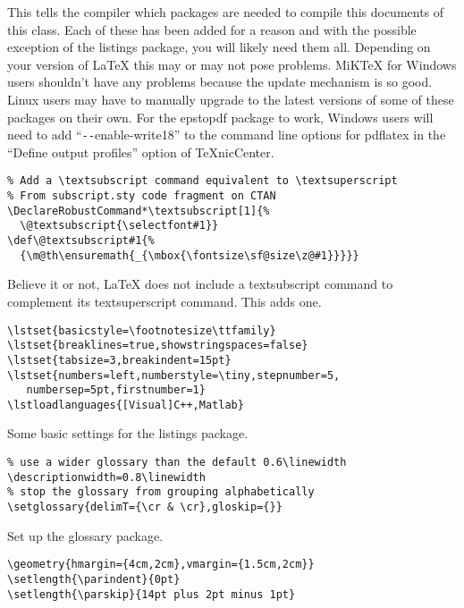 \normalsize\doublespacing
This tells the compiler which packages are needed to compile this documents of this class.  Each of these has been added for a reason and with the possible exception of the listings package, you will likely need them all.  Depending on your version of \LaTeX{} this may or may not pose problems.  MiKTeX for Windows users shouldn't have any problems because the update mechanism is so good.  Linux users may have to manually upgrade to the latest versions of some of these packages on their own. For the epstopdf package to work, Windows users will need to add ``\verb$--$enable-write18'' to the command line options for pdflatex in the ``Define output profiles'' option of TeXnicCenter.

\small\singlespacing
\begin{verbatim}
% Add a \textsubscript command equivalent to \textsuperscript
% From subscript.sty code fragment on CTAN
\DeclareRobustCommand*\textsubscript[1]{%
  \@textsubscript{\selectfont#1}}
\def\@textsubscript#1{%
  {\m@th\ensuremath{_{\mbox{\fontsize\sf@size\z@#1}}}}}
\end{verbatim}

\normalsize\doublespacing
Believe it or not, \LaTeX{} does not include a textsubscript command to complement its textsuperscript command.  This adds one.

\small\singlespacing
\begin{verbatim}
\lstset{basicstyle=\footnotesize\ttfamily}
\lstset{breaklines=true,showstringspaces=false}
\lstset{tabsize=3,breakindent=15pt}
\lstset{numbers=left,numberstyle=\tiny,stepnumber=5,
   numbersep=5pt,firstnumber=1}
\lstloadlanguages{[Visual]C++,Matlab}
\end{verbatim}

\normalsize\doublespacing
Some basic settings for the listings package.

\small\singlespacing
\begin{verbatim}
% use a wider glossary than the default 0.6\linewidth
\descriptionwidth=0.8\linewidth
% stop the glossary from grouping alphabetically
\setglossary{delimT={\cr & \cr},gloskip={}}
\end{verbatim}

\normalsize\doublespacing
Set up the glossary package.

\small\singlespacing
\begin{verbatim}
\geometry{hmargin={4cm,2cm},vmargin={1.5cm,2cm}}
\setlength{\parindent}{0pt}
\setlength{\parskip}{14pt plus 2pt minus 1pt}
\end{verbatim}

